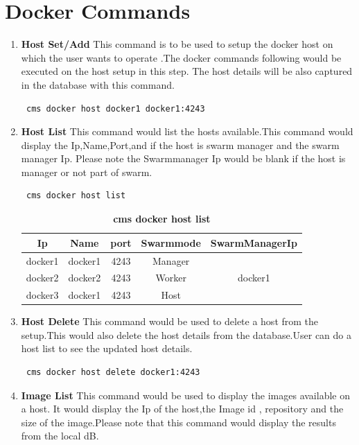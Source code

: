 \documentclass[9pt,twocolumn,twoside]{../../styles/osajnl}
\begin{document}
\section{Docker Commands}
\begin{enumerate}
    \item\textbf{Host Set/Add}
     This command is to be used to setup the docker host on which the user wants to operate .The docker commands following would be executed on the host setup in this step. The host details will be also captured in the database with this command.
    \begin{verbatim} cms docker host docker1 docker1:4243 \end{verbatim}
    
    \item \textbf{Host List}
     This command would list the hosts available.This command would display the Ip,Name,Port,and if the host is swarm manager and the swarm manager Ip. Please note the Swarmmanager Ip would be blank if the host is manager or not part of swarm. 
     \begin{verbatim} cms docker host list \end{verbatim}
     
     \begin{table}[h!]
     \caption{\bf cms docker host list }
     \begin{tabular}{ccccc}
     \hline
      Ip & Name & port & Swarmmode &SwarmManagerIp\\
      \hline
      docker1 & docker1 & 4243 & Manager & \\
      docker2 & docker2 & 4243 & Worker & docker1\\
      docker3 & docker1 & 4243 & Host & \\
     \hline
     \end{tabular}
     \label{tab:tab1}
     \end{table}
     
    \item \textbf{Host Delete}
    This command would be used to delete a host from the setup.This
    would also delete the host details from the database.User can do a
    host list to see the updated host details.

    \begin{verbatim} cms docker host delete docker1:4243 \end{verbatim}
    
    \item \textbf{Image List}
    This command would be used to display the images available on a host.
    It would display the Ip of the host,the Image id , repository and
    the size of the image.Please note that this command would display
    the results from the local dB.


\end{enumerate}
\end{document}
